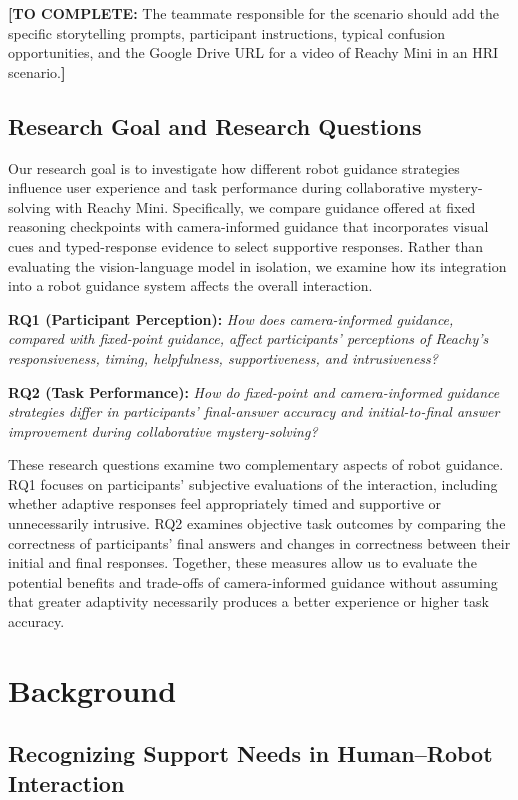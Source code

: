 \documentclass[conference]{IEEEtran}
\newcommand{\drafttodo}[1]{\par\smallskip\noindent\textcolor{red!65!black}{\textbf{[TO COMPLETE:} #1\textbf{]}}\par\smallskip}
\begin{document}
\drafttodo{The teammate responsible for the scenario should add the specific storytelling prompts, participant instructions, typical confusion opportunities, and the Google Drive URL for a video of Reachy Mini in an HRI scenario.}


\subsection{Research Goal and Research Questions}

Our research goal is to investigate how different robot guidance strategies influence user experience and task performance during collaborative mystery-solving with Reachy Mini. Specifically, we compare guidance offered at fixed reasoning checkpoints with camera-informed guidance that incorporates visual cues and typed-response evidence to select supportive responses. Rather than evaluating the vision-language model in isolation, we examine how its integration into a robot guidance system affects the overall interaction.

\noindent\textbf{RQ1 (Participant Perception):} \emph{How does camera-informed guidance, compared with fixed-point guidance, affect participants' perceptions of Reachy's responsiveness, timing, helpfulness, supportiveness, and intrusiveness?}

\noindent\textbf{RQ2 (Task Performance):} \emph{How do fixed-point and camera-informed guidance strategies differ in participants' final-answer accuracy and initial-to-final answer improvement during collaborative mystery-solving?}

These research questions examine two complementary aspects of robot guidance. RQ1 focuses on participants' subjective evaluations of the interaction, including whether adaptive responses feel appropriately timed and supportive or unnecessarily intrusive. RQ2 examines objective task outcomes by comparing the correctness of participants' final answers and changes in correctness between their initial and final responses. Together, these measures allow us to evaluate the potential benefits and trade-offs of camera-informed guidance without assuming that greater adaptivity necessarily produces a better experience or higher task accuracy.



\section{Background}

\subsection{Recognizing Support Needs in Human--Robot Interaction}
\end{document}
